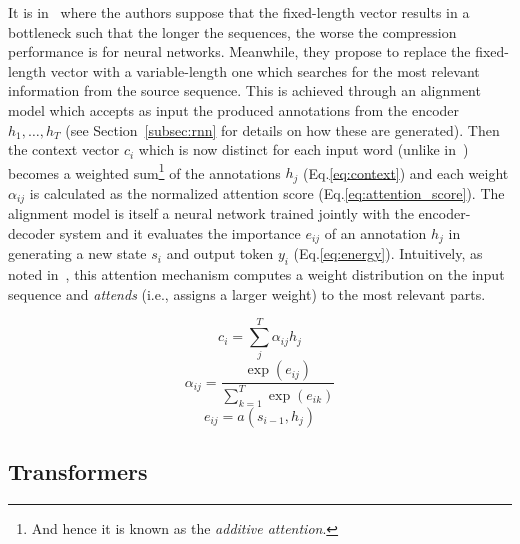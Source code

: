 It is in~\cite{bahdanau2016neural} where the authors suppose that the fixed-length vector results in a bottleneck such that the longer the sequences, the worse the compression performance is for neural networks.
Meanwhile, they propose to replace the fixed-length vector with a variable-length one which searches for the most relevant information from the source sequence.
This is achieved through an alignment model which accepts as input the produced annotations from the encoder $h_1,\ldots, h_T$ (see Section~\ref{subsec:rnn} for details on how these are generated).
Then the context vector $c_{i}$ which is now distinct for each input word (unlike in~\cite{cho-etal-2014-learning,sutskever2014sequence}) becomes a weighted sum\footnote{
    And hence it is known as the \emph{additive attention}.
} of the annotations $h_{j}$ (Eq.\ref{eq:context}) and each weight $\alpha_{ij}$ is calculated as the normalized attention score (Eq.\ref{eq:attention_score}).
The alignment model is itself a neural network trained jointly with the encoder-decoder system and it evaluates the importance $e_{ij}$ of an annotation $h_{j}$ in generating a new state $s_{i}$ and output token $y_{i}$ (Eq.\ref{eq:energy}).
Intuitively, as noted in~\cite{galassi2020attention}, this attention mechanism computes a weight distribution on the input sequence and \emph{attends} (i.e., assigns a larger weight) to the most relevant parts.

\begin{equation}\label{eq:context}
    c_i = \sum_j^T{\alpha_{ij}h_j}
\end{equation}
\begin{equation}\label{eq:attention_score}
    \alpha_{ij} = \frac{\exp(e_{ij})}{\sum_{k=1}^{T} \exp(e_{ik})}
\end{equation}
\begin{equation}\label{eq:energy}
    e_{ij} = a(s_{i-1}, h_j)
\end{equation}

\subsection{Transformers}\label{subsec:transformers}

